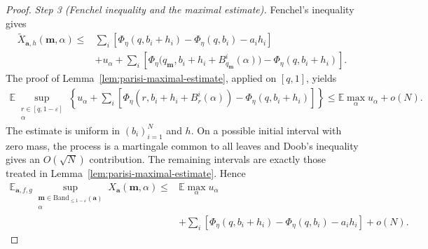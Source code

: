 \documentclass[a4paper,10pt,reqno]{amsart}
\numberwithin{equation}{section}
\newcommand{\ve}{\varepsilon}
\newcommand{\dE}{\mathbb{E}}%
\newcommand{\Band}{\mathrm{Band}}
\newcommand{\bfm}{\mathbf{m}}
\newcommand{\bfa}{\mathbf{a}}
\begin{document}
\begin{proof}
		\medskip\noindent\emph{Step 3 (Fenchel inequality and the maximal estimate).}\;
		Fenchel's inequality gives
		\[
		\begin{aligned}
			\widetilde X_{\bfa,h}(\bfm,\alpha)
			\le{}&
			\sum_i
			\left[
			\Phi_\eta(q,b_i+h_i)
			-\Phi_\eta(q,b_i)-a_i h_i
			\right]\\
			&+
			u_\alpha+
			\sum_i
			\left[
			\Phi_\eta\bigl(
			q_\bfm,b_i+h_i+B_{q_\bfm}^i(\alpha)
			\bigr)
			-\Phi_\eta(q,b_i+h_i)
			\right].
		\end{aligned}
		\]
		The proof of Lemma~\ref{lem:parisi-maximal-estimate}, applied on
		$[q,1]$, yields
		\[
		\begin{aligned}
			\dE
			\sup_{\substack{r\in[q,1-\ve]\\\alpha}}
			\left\{
			u_\alpha+
			\sum_i
			\left[
			\Phi_\eta(r,b_i+h_i+B_r^i(\alpha))
			-\Phi_\eta(q,b_i+h_i)
			\right]
			\right\}
			\le
			\dE\max_\alpha u_\alpha+o(N).
		\end{aligned}
		\]
		The estimate is uniform in $(b_i)_{i=1}^N$ and $h$. On a possible initial
		interval with zero mass, the process is a martingale common to all
		leaves and Doob's inequality gives an $O(\sqrt N)$ contribution.
		The remaining intervals are exactly those treated in
		Lemma~\ref{lem:parisi-maximal-estimate}. Hence
		\[
		\begin{aligned}
			\dE_{\bfa,f,g}
			\sup_{\substack{
					\bfm\in\Band_{\le1-\ve}(\bfa)\\
					\alpha
			}}
			X_{\bfa}(\bfm,\alpha)
			\le{}&
			\dE\max_\alpha u_\alpha\\
			&+
			\sum_i
			\left[
			\Phi_\eta(q,b_i+h_i)
			-\Phi_\eta(q,b_i)-a_i h_i
			\right]
			+o(N).
		\end{aligned}
		\]
		

\end{proof}
\end{document}
